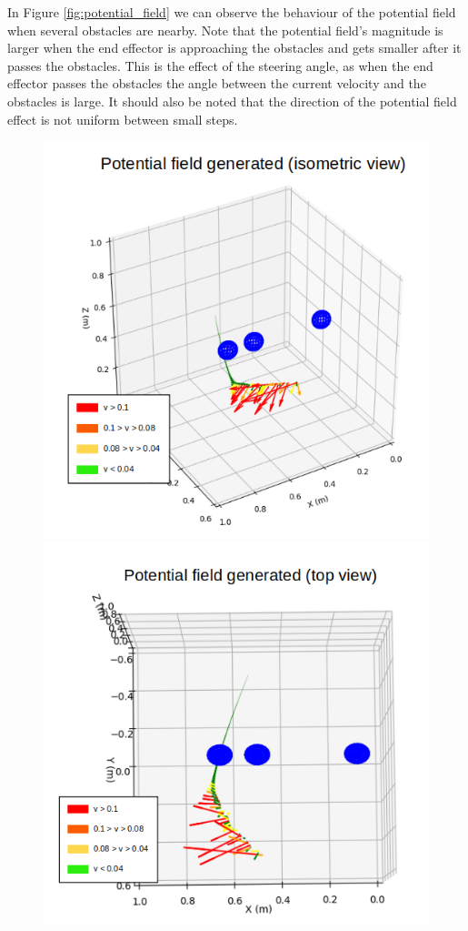 \documentclass[a4paper, 11.5pt, conference]{ieeeconf}      %
\begin{document}
In Figure \ref{fig:potential_field} we can observe the behaviour of the potential field when several obstacles are nearby. Note that the potential field's magnitude is larger when the end effector is approaching the obstacles and gets smaller after it passes the obstacles. This is the effect of the steering angle, as when the end effector passes the obstacles the angle between the current velocity and the obstacles is large. It should also be noted that the direction of the potential field effect is not uniform between small steps.

\begin{figure}[H]
	\centering
	\includegraphics[scale=0.30]{images/potential_field.png}
	\includegraphics[scale=0.30]{images/potential_field_top.png}

\end{figure}
\end{document}

